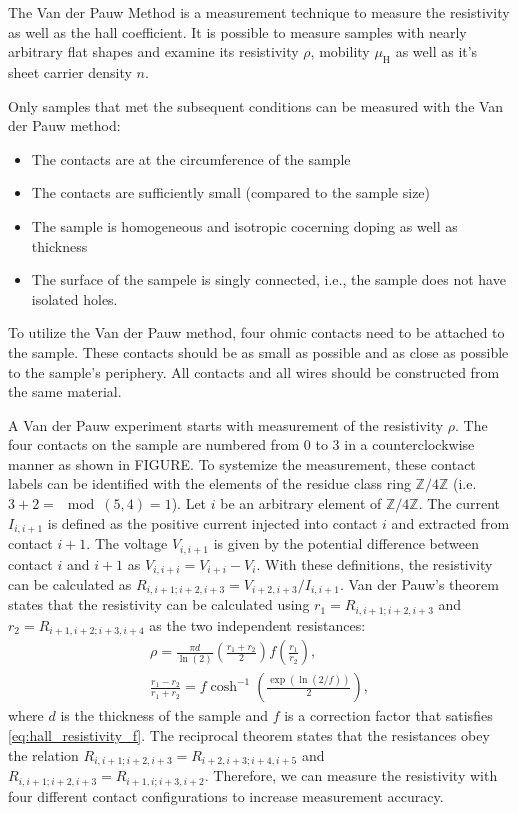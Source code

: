 The Van der Pauw Method is a measurement technique to measure the resistivity as well 
as the hall coefficient.
It is possible to measure samples with nearly arbitrary flat shapes and examine its 
resistivity $\rho$, mobility $\mu_\mathrm{H}$ as well as it's sheet carrier density $n$. 

Only samples that met the subsequent conditions can be measured with the Van der Pauw 
method:
\begin{itemize}
	\item The contacts are at the circumference of the sample
	\item The contacts are sufficiently small (compared to the sample size)
	\item The sample is homogeneous and isotropic cocerning doping as well as thickness
	\item The surface of the sampele is singly connected, i.e., the sample does not 
	have isolated holes.
\end{itemize}
To utilize the Van der Pauw method, four ohmic contacts need to be attached to the 
sample.
These contacts should be as small as possible and as close as possible to the sample's 
periphery. 
All contacts and all wires should be constructed from the same material. 

A Van der Pauw experiment starts with measurement of the resistivity $\rho$.
The four contacts on the sample are numbered from \num{0} to \num{3} in a 
counterclockwise manner as shown in FIGURE. 
To systemize the measurement, these contact labels can be identified with the 
elements of the residue class ring $\mathbb{Z}/4\mathbb{Z}$ (i.e. $3+2=\mod(5,4)=1$).
Let $i$ be an arbitrary element of $\mathbb{Z}/4\mathbb{Z}$.
The current $I_{i, i+1}$ is defined as the positive current injected into contact $i$ 
and extracted from contact $i+1$.
The voltage $V_{i, i+1}$ is given by the potential difference between contact $i$ and 
$i+1$ as $V_{i, i+i}=V_{i+i}-V_i$. 
With these definitions, the resistivity can be calculated as 
$R_{i, i+1; i+2, i+3}=V_{i+2, i+3} / {I_{i, i+1}}$. 
Van der Pauw's theorem states that the resistivity can be calculated using 
$r_1=R_{i, i+1; i+2, i+3}$ and $r_2=R_{i+1, i+2; i+3, i+4}$ as the two independent 
resistances:
\begin{align}
	\rho=\frac{\pi d}{\ln(2)} \left( \frac{r_1+r_2}{2} \right)f
	\left( \frac{r_1}{r_2} \right), \label{eq:hall_resistivity}\\
	\frac{r_1-r_2}{r_1+r_2}=f \cosh^{-1} \left( \frac{\exp(\ln(2 /f))}{2} \right),
	\label{eq:hall_resistivity_f}
\end{align}
where $d$ is the thickness of the sample and $f$ is a correction factor that satisfies 
\cref{eq:hall_resistivity_f}. 
The reciprocal theorem states that the resistances obey the relation 
$R_{i, i+1; i+2, i+3}=R_{i+2, i+3; i+4, i+5}$ and 
$R_{i, i+1;i+2, i+3}=R_{i+1, i; i+3, i+2}$.
Therefore, we can measure the resistivity with four different contact configurations to 
increase measurement accuracy.

